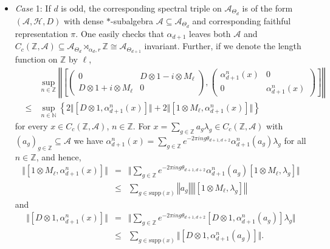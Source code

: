 \documentclass[a4paper,11pt,reqno]{amsart}
\numberwithin{equation}{section}
\numberwithin{equation}{section}
\theoremstyle{definition}
\theoremstyle{remark}
\theoremstyle{remark}
\begin{document}
\begin{itemize}
\item \emph{Case }1: If $d$ is odd, the corresponding spectral triple on
$\mathcal{A}_{\Theta_{d}}$ is of the form $\left(\mathcal{A},\mathcal{H},D\right)$
with dense $\ast$-subalgebra $\mathcal{A}\subseteq\mathcal{A}_{\Theta_{d}}$
and corresponding faithful representation $\pi$. One easily checks
that $\alpha_{d+1}$ leaves both $\mathcal{A}$ and $C_{c}(\mathbb{Z},\mathcal{A})\subseteq\mathcal{A}_{\Theta_{d}}\rtimes_{\alpha_{d},r}\mathbb{Z}\cong\mathcal{A}_{\Theta_{d+1}}$
invariant. Further, if we denote the length function on $\mathbb{Z}$
by $\ell$,
\begin{eqnarray}
\nonumber
& & \sup_{n\in\mathbb{Z}}\left\Vert \left[\left(\begin{array}{cc}
0 & D\otimes1-i\otimes M_{\ell}\\
D\otimes1+i\otimes M_{\ell} & 0
\end{array}\right),\left(\begin{array}{cc}
\alpha_{d+1}^{n}(x) & 0\\
0 & \alpha_{d+1}^{n}(x)
\end{array}\right)\right]\right\Vert  \\
&\leq& \sup_{n\in\mathbb{N}}\left\{ 2\Vert[D\otimes1,\alpha_{d+1}^{n}(x)]\Vert+ 2\Vert[1\otimes M_{\ell},\alpha_{d+1}^{n}(x)]\Vert\right\} \label{eq:Supremum2}
\end{eqnarray}
 for every $x\in C_{c}(\mathbb{Z},\mathcal{A})$, $n\in\mathbb{Z}$.
For $x=\sum_{g\in\mathbb{Z}}a_{g}\lambda_{g}\in C_{c}(\mathbb{Z},\mathcal{A})$
with $(a_{g})_{g\in\mathbb{Z}}\subseteq\mathcal{A}$ we have $\alpha_{d+1}^{n}(x)=\sum_{g\in\mathbb{Z}}e^{-2\pi ing\theta_{d+1,d+2}}\alpha_{d+1}^{n}(a_{g})\lambda_{g}$
for all $n\in\mathbb{Z}$, and hence,
\begin{eqnarray}
\nonumber
\Vert[1\otimes M_{\ell},\alpha_{d+1}^{n}(x)]\Vert &=& \Vert\sum_{g\in\mathbb{Z}}e^{-2\pi ing \theta_{d+1,d+2}}\alpha_{d+1}^{n}(a_{g})[1\otimes M_{\ell},\lambda_{g}]\Vert \\
\nonumber
&\leq& \sum_{g\in\text{supp}(x)}\left\Vert a_{g}\right\Vert \left\Vert [1\otimes M_{\ell},\lambda_{g}]\right\Vert 
\end{eqnarray}
and 
\begin{eqnarray}
\nonumber
\Vert[D\otimes1,\alpha_{d+1}^{n}(x)]\Vert &=& \Vert\sum_{g\in\mathbb{Z}}e^{-2\pi ing \theta_{d+1,d+2}}[D\otimes1,\alpha_{d+1}^{n}(a_{g})]\lambda_{g}\Vert \\
\nonumber
&\leq& \sum_{g\in\text{supp}(x)}\Vert[D\otimes1,\alpha_{d+1}^{n}(a_{g})]\Vert.

\end{eqnarray}
\end{itemize}
\end{document}
